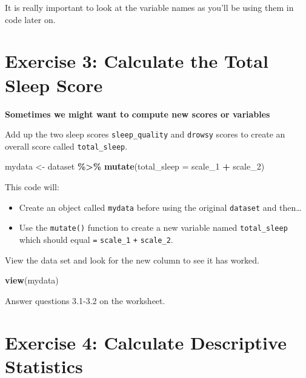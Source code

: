 \documentclass[
]{book}
\newenvironment{Shaded}{\begin{snugshade}}{\end{snugshade}}
\newcommand{\AttributeTok}[1]{\textcolor[rgb]{0.13,0.29,0.53}{#1}}
\newcommand{\FunctionTok}[1]{\textcolor[rgb]{0.13,0.29,0.53}{\textbf{#1}}}
\newcommand{\NormalTok}[1]{#1}
\newcommand{\OtherTok}[1]{\textcolor[rgb]{0.56,0.35,0.01}{#1}}
\newcommand{\SpecialCharTok}[1]{\textcolor[rgb]{0.81,0.36,0.00}{\textbf{#1}}}
\let\oldsection\section
\renewcommand{\section}{\needspace{5\baselineskip}\oldsection}
\begin{document}
It is really important to look at the variable names as you'll be using them in code later on.

\section{Exercise 3: Calculate the Total Sleep Score}\label{exercise-3-calculate-the-total-sleep-score}

\textbf{Sometimes we might want to compute new scores or variables}

Add up the two sleep scores \texttt{sleep\_quality} and \texttt{drowsy} scores to create an overall score called \texttt{total\_sleep}.

\begin{Shaded}
\begin{Highlighting}[]
\NormalTok{mydata }\OtherTok{\textless{}{-}}\NormalTok{ dataset }\SpecialCharTok{\%\textgreater{}\%}
  \FunctionTok{mutate}\NormalTok{(}\AttributeTok{total\_sleep =}\NormalTok{ scale\_1 }\SpecialCharTok{+}\NormalTok{ scale\_2)}
\end{Highlighting}
\end{Shaded}

This code will:

\begin{itemize}
\item
  Create an object called \texttt{mydata} before using the original \texttt{dataset} and then\ldots{}
\item
  Use the \texttt{mutate()} function to create a new variable named \texttt{total\_sleep} which should equal \texttt{=} \texttt{scale\_1} \texttt{+} \texttt{scale\_2}.
\end{itemize}

View the data set and look for the new column to see it has worked.

\begin{Shaded}
\begin{Highlighting}[]
\FunctionTok{view}\NormalTok{(mydata)}
\end{Highlighting}
\end{Shaded}

Answer questions 3.1-3.2 on the worksheet.

\section{Exercise 4: Calculate Descriptive Statistics}\label{exercise-4-calculate-descriptive-statistics}
\end{document}

